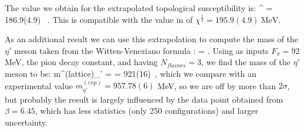 
The value we obtain for the extrapolated topological susceptibility is:
\beq
    \chi^{} = 186.9(4.9)~ .
    \label{val:tops}
\eeq 
This is compatible with the value in \cite{shindler_nucleon_2015} of  $\chi^{\frac{1}{4}} = 195.9(4.9)~\text{MeV} $. 

As an additional result we can use this extrapolation to compute the mass of the $\eta'$ meson taken from the Witten-Veneziano formula \cite{witten_current_1979}:
\beq
    \chi = .
\eeq 
Using as inputs $F_\pi = 92$ MeV, the pion decay constant, and having $N_{flavors} = 3$, we find the mass of the $\eta'$ meson to be:
\beq    
    m^{(lattice)}_{\eta'} =  = 921(16)~,
\eeq
which we compare with an experimental value  $m^{(exp)}_{\eta'} = 957.78(6)$ MeV, so we are off by more than $2\sigma$, but probably the result is largely influenced by the data point obtained from $\beta=6.45$, which has less statistics (only 250 configurations) and larger uncertainty.